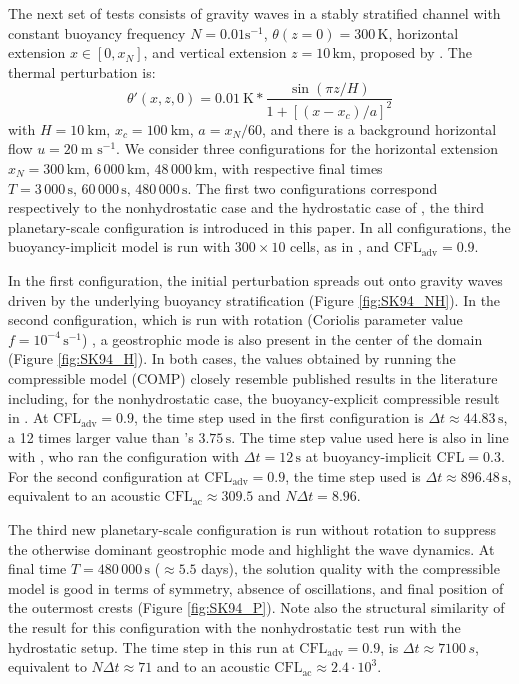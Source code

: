 \documentclass{ametsoc}
\newcommand{\sblue}[1]{\textcolor{sblue}{#1}}
\newcommand{\revision}[1]{\sblue{#1}}
\theoremstyle{definition}
\newcommand{\dt}{\Delta t}
\begin{document}
The next set of tests consists of gravity waves in a stably stratified channel with constant buoyancy frequency $N=0.01\textrm{s}^{-1}$, $\theta(z=0)=300\,\textrm{K}$, horizontal extension $x\in[0,x_N]$, and vertical extension $z=10\,\textrm{km}$, proposed by \cite{SkamarockKlemp1994}. The thermal perturbation is:
%
\begin{equation}
 \theta'(x, z, 0)=0.01~\textrm{K}*\dfrac{\sin(\pi z/H)}{1+[(x-x_c)/a]^2}\label{eq: init_theta_pert_igw} 
\end{equation} 
%
with $H=10~\textrm{km}$, $x_c=100~\textrm{km}$, $a=x_N/60$, and there is a background horizontal flow $u=20~\textrm{m s}^{-1}$. We consider three configurations for the horizontal extension $x_N=300\,\textrm{km},\,6\,000\,\textrm{km},\,48\,000\,\textrm{km}$, with respective final times $T=3\,000\,\textrm{s},\,60\,000\,\textrm{s},\,480\,000\,\textrm{s}$. The first two configurations correspond \revision{respectively} to the nonhydrostatic case and the hydrostatic case of \cite{SkamarockKlemp1994}, the third planetary-scale configuration is introduced in this paper. In all configurations, the buoyancy-implicit model is run with $300\times10$ cells, as in \citet{SkamarockKlemp1994}, and CFL$_\textrm{adv}=0.9$.

In the first configuration, the initial perturbation spreads out onto gravity waves driven by the underlying buoyancy stratification (Figure \ref{fig:SK94_NH}). In the second configuration, which is run with rotation (Coriolis parameter value $f=10^{-4}\,\textrm{s}^{-1}$) , a geostrophic mode is also present in the center of the domain (Figure \ref{fig:SK94_H}). In both cases, the values obtained by running the compressible model (COMP) closely resemble published results in the literature including, for the nonhydrostatic case, the buoyancy-explicit compressible result in \cite{BenacchioEtAl2014}. At CFL$_\textrm{adv}=0.9$, the time step used in the first configuration is $\Delta t\approx44.83\,\textrm{s}$, a 12 times larger value than \cite{BenacchioEtAl2014}'s $3.75\,\textrm{s}$. The time step value used here is also in line with \cite{MelvinEtAl2018}, who ran the configuration with $\dt=12\,\textrm{s}$ at buoyancy-implicit CFL$=0.3$. For the second configuration at CFL$_\textrm{adv}=0.9$, the time step used is $\Delta t\approx896.48\,\textrm{s}$, equivalent to an acoustic $\mathrm{CFL}_{\mathrm{ac}}\approx309.5$ and $N\dt = 8.96$.

The third new planetary-scale configuration is run without rotation to suppress the otherwise dominant geostrophic mode and highlight the wave dynamics. At final time $T=480\,000\,\textrm{s}$ ($\approx5.5$ days), the solution quality with the compressible model is good in terms of symmetry, absence of oscillations, and final position of the outermost crests (Figure \ref{fig:SK94_P}). \revision{Note also the structural similarity of the result for this configuration with the nonhydrostatic test run with the hydrostatic setup.} The time step in this run at $\mathrm{CFL}_\mathrm{adv} = 0.9$, is $\dt\approx7100\,s$, equivalent to $N \dt\approx71$ and to an acoustic $\mathrm{CFL}_\mathrm{ac}\approx2.4\cdot 10^3$.
\end{document}
